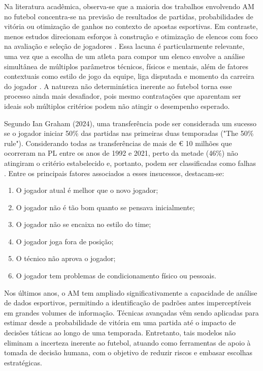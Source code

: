 Na literatura acadêmica, observa-se que a maioria dos trabalhos envolvendo AM no futebol concentra-se na previsão de resultados de partidas, probabilidades de 
vitória ou otimização de ganhos no contexto de apostas esportivas. Em contraste, menos estudos direcionam esforços à construção e otimização de elencos com foco 
na avaliação e seleção de jogadores \cite{Abidin2021}. Essa lacuna é particularmente relevante, uma vez que a escolha de um atleta para compor um elenco envolve 
a análise simultânea de múltiplos parâmetros técnicos, físicos e mentais, além de fatores contextuais como estilo de jogo da equipe, liga disputada e momento da 
carreira do jogador \cite{Abidin2021}. A natureza não determinística inerente ao futebol torna esse processo ainda mais desafiador, pois mesmo contratações que 
aparentam ser ideais sob múltiplos critérios podem não atingir o desempenho esperado.

Segundo Ian Graham (2024), uma transferência pode ser considerada um sucesso se o jogador iniciar 50\% das partidas nas primeiras duas temporadas ("The 50\% rule"). 
Considerando todas as transferências de mais de € 10 milhões que ocorreram na PL entre os anos de 1992 e 2021, perto da metade (46\%) não atingiram o critério 
estabelecido e, portanto, podem ser classificadas como falhas \cite{Graham2024}. Entre os principais fatores associados a esses insucessos, destacam-se:

\begin{enumerate}
    \item O jogador atual é melhor que o novo jogador;
    \item O jogador não é tão bom quanto se pensava inicialmente;
    \item O jogador não se encaixa no estilo do time;
    \item O jogador joga fora de posição;
    \item O técnico não aprova o jogador;
    \item O jogador tem problemas de condicionamento físico ou pessoais.
\end{enumerate}

Nos últimos anos, o AM tem ampliado significativamente a capacidade de análise de dados esportivos, permitindo a identificação de padrões antes 
imperceptíveis em grandes volumes de informação. Técnicas avançadas vêm sendo aplicadas para estimar desde a probabilidade de vitória em uma partida até o impacto de 
decisões táticas ao longo de uma temporada. Entretanto, tais modelos não eliminam a incerteza inerente ao futebol, atuando como ferramentas de apoio à tomada de 
decisão humana, com o objetivo de reduzir riscos e embasar escolhas estratégicas.

